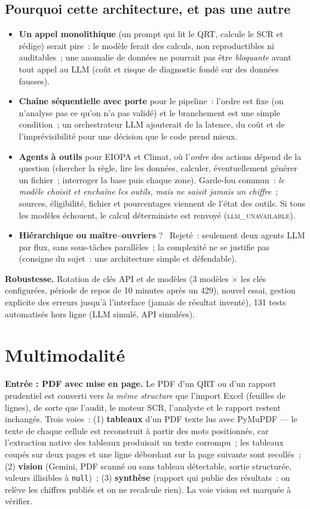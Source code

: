 \documentclass[11pt,a4paper]{article}
\newcommand{\code}[1]{\texttt{\small #1}}
\begin{document}
\subsection{Pourquoi cette architecture, et pas une autre}
\begin{itemize}
\item \textbf{Un appel monolithique} (un prompt qui lit le QRT, calcule le SCR et r\'edige) serait pire~: le mod\`ele ferait des calculs, non reproductibles ni auditables~; une anomalie de donn\'ees ne pourrait pas \^etre \emph{bloquante} avant tout appel au LLM (co\^ut et risque de diagnostic fond\'e sur des donn\'ees fausses).
\item \textbf{Cha\^ine s\'equentielle avec porte} pour le pipeline~: l'ordre est fixe (on n'analyse pas ce qu'on n'a pas valid\'e) et le branchement est une simple condition~; un orchestrateur LLM ajouterait de la latence, du co\^ut et de l'impr\'evisibilit\'e pour une d\'ecision que le code prend mieux.
\item \textbf{Agents \`a outils} pour EIOPA et Climat, o\`u l'\emph{ordre} des actions d\'epend de la question (chercher la r\`egle, lire les donn\'ees, calculer, \'eventuellement g\'en\'erer un fichier~; interroger la base puis chaque zone). Garde-fou commun~: \emph{le mod\`ele choisit et encha\^ine les outils, mais ne saisit jamais un chiffre}~; sources, \'eligibilit\'e, fichier et pourcentages viennent de l'\'etat des outils. Si tous les mod\`eles \'echouent, le calcul d\'eterministe est renvoy\'e (\textsc{llm\_unavailable}).
\item \textbf{Hi\'erarchique ou ma\^itre--ouvriers} ?~ Rejet\'e~: seulement deux agents LLM par flux, sans sous-t\^aches parall\`eles~; la complexit\'e ne se justifie pas (consigne du sujet~: une architecture simple et d\'efendable).
\end{itemize}
\textbf{Robustesse.} Rotation de cl\'es API et de mod\`eles (3 mod\`eles $\times$ les cl\'es configur\'ees, p\'eriode de repos de 10 minutes apr\`es un 429), nouvel essai, gestion explicite des erreurs jusqu'\`a l'interface (jamais de r\'esultat invent\'e), 131 tests automatis\'es hors ligne (LLM simul\'e, API simul\'ees).

\section{Multimodalit\'e}
\textbf{Entr\'ee : PDF avec mise en page.} Le PDF d'un QRT ou d'un rapport prudentiel est converti vers \emph{la m\^eme structure} que l'import Excel (feuilles de lignes), de sorte que l'audit, le moteur SCR, l'analyste et le rapport restent inchang\'es. Trois voies~: (1) \textbf{tableaux} d'un PDF texte lus avec PyMuPDF --- le texte de chaque cellule est reconstruit \`a partir des mots positionn\'es, car l'extraction native des tableaux produisait un texte corrompu~; les tableaux coup\'es sur deux pages et une ligne d\'ebordant sur la page suivante sont recoll\'es~; (2) \textbf{vision} (Gemini, PDF scann\'e ou sans tableau d\'etectable, sortie structur\'ee, valeurs illisibles \`a \code{null})~; (3) \textbf{synth\`ese} (rapport qui publie des r\'esultats~: on relève les chiffres publi\'es et on ne recalcule rien). La voie vision est marqu\'ee \og \`a v\'erifier\fg{}.
\end{document}

